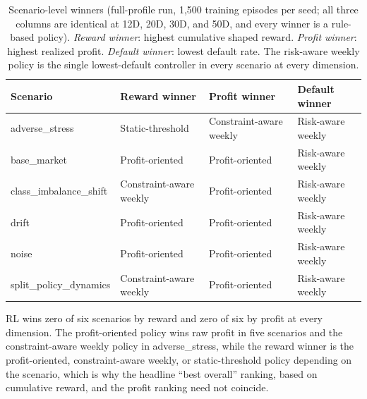 \documentclass[preprint,review,authoryear,12pt]{elsarticle}
\begin{document}
\begin{table}[t]
    \centering
    \small
    \caption{Scenario-level winners (full-profile run, 1{,}500 training episodes per seed;
        all three columns are identical at 12D, 20D, 30D, and 50D, and every winner is a
        rule-based policy).
        \textit{Reward winner}: highest cumulative shaped reward. \textit{Profit winner}:
        highest realized profit. \textit{Default winner}: lowest default rate. The
        risk-aware weekly policy is the single lowest-default controller in every scenario
        at every dimension.}
    \label{tab:scenario-winners}
    \setlength{\tabcolsep}{4pt}
    \begin{tabular}{>{\ttfamily}l l l l}
        \toprule
        Scenario                & Reward winner           & Profit winner           & Default winner    \\
        \midrule
        adverse\_stress         & Static-threshold        & Constraint-aware weekly & Risk-aware weekly \\
        base\_market            & Profit-oriented         & Profit-oriented         & Risk-aware weekly \\
        class\_imbalance\_shift & Constraint-aware weekly & Profit-oriented         & Risk-aware weekly \\
        drift                   & Profit-oriented         & Profit-oriented         & Risk-aware weekly \\
        noise                   & Profit-oriented         & Profit-oriented         & Risk-aware weekly \\
        split\_policy\_dynamics & Constraint-aware weekly & Profit-oriented         & Risk-aware weekly \\
        \bottomrule
    \end{tabular}
\end{table}

RL wins zero of six scenarios by reward and zero of six by profit at every dimension.
The profit-oriented policy wins raw profit in five scenarios and the constraint-aware
weekly policy in adverse\_stress, while the reward winner is the profit-oriented,
constraint-aware weekly, or static-threshold policy depending on the scenario, which is
why the headline ``best overall'' ranking, based on cumulative reward, and the profit
ranking need not coincide.
\end{document}
